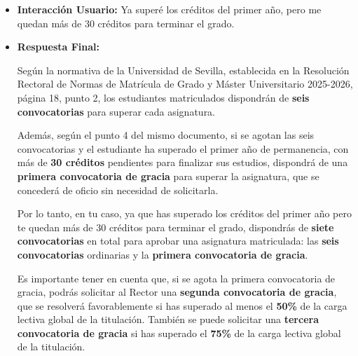 \documentclass{article}
\begin{document}
\begin{itemize}
\begin{itemize}
                Es importante tener en cuenta que, si se agota la \textbf{primera convocatoria de gracia}, el estudiante puede solicitar al Rector una \textbf{segunda convocatoria de gracia}, que se resolverá favorablemente si el estudiante ha superado al menos el \textbf{50\%} de la carga lectiva global de la titulación. También se puede solicitar una \textbf{tercera convocatoria de gracia} si el estudiante ha superado el \textbf{75\%} de la carga lectiva global de la titulación.

                En resumen, el número total de convocatorias para aprobar una asignatura puede variar dependiendo de la situación del estudiante, pero inicialmente se dispone de \textbf{seis convocatorias}, con la posibilidad de obtener convocatorias de gracia adicionales bajo ciertas condiciones.
          \item \textbf{Interacción Usuario:} Ya superé los créditos del primer año, pero me quedan más de 30 créditos para terminar el grado.
          \item \textbf{Respuesta Final:}

                Según la normativa de la Universidad de Sevilla, establecida en la Resolución Rectoral de Normas de Matrícula de Grado y Máster Universitario 2025-2026, página 18, punto 2, los estudiantes matriculados dispondrán de \textbf{seis convocatorias} para superar cada asignatura.

                Además, según el punto 4 del mismo documento, si se agotan las seis convocatorias y el estudiante ha superado el primer año de permanencia, con más de \textbf{30 créditos} pendientes para finalizar sus estudios, dispondrá de una \textbf{primera convocatoria de gracia} para superar la asignatura, que se concederá de oficio sin necesidad de solicitarla.

                Por lo tanto, en tu caso, ya que has superado los créditos del primer año pero te quedan más de 30 créditos para terminar el grado, dispondrás de \textbf{siete convocatorias} en total para aprobar una asignatura matriculada: las \textbf{seis convocatorias} ordinarias y la \textbf{primera convocatoria de gracia}.

                Es importante tener en cuenta que, si se agota la primera convocatoria de gracia, podrás solicitar al Rector una \textbf{segunda convocatoria de gracia}, que se resolverá favorablemente si has superado al menos el \textbf{50\%} de la carga lectiva global de la titulación. También se puede solicitar una \textbf{tercera convocatoria de gracia} si has superado el \textbf{75\%} de la carga lectiva global de la titulación.
        \end{itemize}



\end{itemize}
\end{document}

